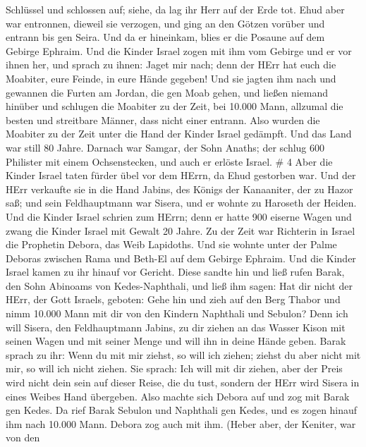 Schlüssel und schlossen auf; siehe, da lag ihr Herr auf der Erde tot.
 Ehud aber war entronnen, dieweil sie verzogen, und ging an
den Götzen vorüber und entrann bis gen Seira.  Und da er
hineinkam, blies er die Posaune auf dem Gebirge Ephraim. Und die Kinder
Israel zogen mit ihm vom Gebirge und er vor ihnen her,  und
sprach zu ihnen: Jaget mir nach; denn der HErr hat euch die Moabiter,
eure Feinde, in eure Hände gegeben! Und sie jagten ihm nach und gewannen
die Furten am Jordan, die gen Moab gehen, und ließen niemand hinüber
 und schlugen die Moabiter zu der Zeit, bei 10.000 Mann,
allzumal die besten und streitbare Männer, dass nicht einer entrann.
 Also wurden die Moabiter zu der Zeit unter die Hand der
Kinder Israel gedämpft. Und das Land war still 80 Jahre. 
Darnach war Samgar, der Sohn Anaths; der schlug 600 Philister mit einem
Ochsenstecken, und auch er erlöste Israel. \# 4  Aber die
Kinder Israel taten fürder übel vor dem HErrn, da Ehud gestorben war.
 Und der HErr verkaufte sie in die Hand Jabins, des Königs
der Kanaaniter, der zu Hazor saß; und sein Feldhauptmann war Sisera, und
er wohnte zu Haroseth der Heiden.  Und die Kinder Israel
schrien zum HErrn; denn er hatte 900 eiserne Wagen und zwang die Kinder
Israel mit Gewalt 20 Jahre.  Zu der Zeit war Richterin in
Israel die Prophetin Debora, das Weib Lapidoths.  Und sie
wohnte unter der Palme Deboras zwischen Rama und Beth-El auf dem Gebirge
Ephraim. Und die Kinder Israel kamen zu ihr hinauf vor Gericht.
 Diese sandte hin und ließ rufen Barak, den Sohn Abinoams
von Kedes-Naphthali, und ließ ihm sagen: Hat dir nicht der HErr, der
Gott Israels, geboten: Gehe hin und zieh auf den Berg Thabor und nimm
10.000 Mann mit dir von den Kindern Naphthali und Sebulon? 
Denn ich will Sisera, den Feldhauptmann Jabins, zu dir ziehen an das
Wasser Kison mit seinen Wagen und mit seiner Menge und will ihn in deine
Hände geben.  Barak sprach zu ihr: Wenn du mit mir ziehst,
so will ich ziehen; ziehst du aber nicht mit mir, so will ich nicht
ziehen.  Sie sprach: Ich will mit dir ziehen, aber der Preis
wird nicht dein sein auf dieser Reise, die du tust, sondern der HErr
wird Sisera in eines Weibes Hand übergeben. Also machte sich Debora auf
und zog mit Barak gen Kedes.  Da rief Barak Sebulon und
Naphthali gen Kedes, und es zogen hinauf ihm nach 10.000 Mann. Debora
zog auch mit ihm.  (Heber aber, der Keniter, war von den

